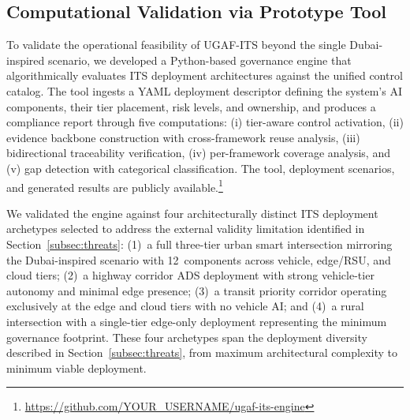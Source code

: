 %
%



\subsection{Computational Validation via Prototype Tool}
\label{subsec:prototype_tool}

To validate the operational feasibility of UGAF-ITS beyond the single
Dubai-inspired scenario, we developed a Python-based governance engine
that algorithmically evaluates ITS deployment architectures against the
unified control catalog. The tool ingests a YAML deployment descriptor
defining the system's AI components, their tier placement, risk levels,
and ownership, and produces a compliance report through five computations:
(i) tier-aware control activation, (ii) evidence backbone construction
with cross-framework reuse analysis, (iii) bidirectional traceability
verification, (iv) per-framework coverage analysis, and (v) gap
detection with categorical classification. The tool, deployment
scenarios, and generated results are publicly available.\footnote{%
\url{https://github.com/YOUR_USERNAME/ugaf-its-engine}}

We validated the engine against four architecturally distinct ITS
deployment archetypes selected to address the external validity
limitation identified in Section~\ref{subsec:threats}: (1)~a full
three-tier urban smart intersection mirroring the Dubai-inspired
scenario with 12~components across vehicle, edge/RSU, and cloud tiers;
(2)~a highway corridor ADS deployment with strong vehicle-tier autonomy
and minimal edge presence; (3)~a transit priority corridor operating
exclusively at the edge and cloud tiers with no vehicle AI; and
(4)~a rural intersection with a single-tier edge-only deployment
representing the minimum governance footprint. These four archetypes
span the deployment diversity described in Section~\ref{subsec:threats},
from maximum architectural complexity to minimum viable deployment.

